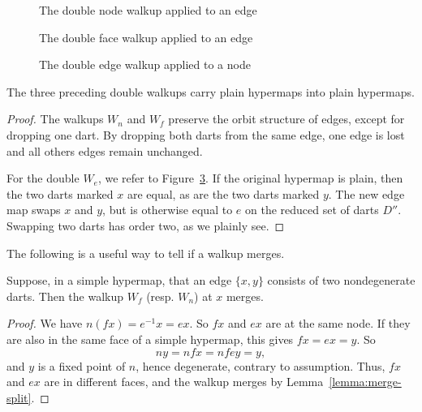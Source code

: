 \begin{figure}[htb]
  \centering
  \caption{The double node walkup applied to an edge}
  \label{fig:doublenode}
\end{figure}


\begin{figure}[htb]
  \centering
  \caption{The double face walkup applied to an edge}
  \label{fig:doubleface}
\end{figure}


\begin{figure}[htb]
  \centering
  \caption{The double edge walkup applied to a node}
  \label{fig:doubleedge}
\end{figure}


\begin{lemma}  The three preceding double walkups carry plain
hypermaps into plain hypermaps.
\end{lemma}

\begin{proof} The walkups $W_n$ and $W_f$ preserve the orbit
structure of edges, except for dropping one dart.  By dropping both
darts from the same edge, one edge is lost and all others edges
remain unchanged.

For the double $W_e$, we refer to Figure~\ref{fig:doubleedge}.  
If the
original hypermap is plain, then the two darts marked 
$x$ are equal, as are
the two darts marked $y$.  
The new edge map swaps $x$ and $y$, but is 
otherwise equal to $e$ on 
the reduced set of darts $D''$.  
Swapping two darts has order two, 
as we plainly see.
\end{proof}

The following is a useful way to tell if a walkup merges.


\begin{lemma}  Suppose, in a simple hypermap, 
that an edge $\{x,y\}$ consists of two nondegenerate darts.  
Then the walkup
 $W_f$ (resp. $W_n$) at $x$  merges.
\end{lemma}

\begin{proof} 
We have $n (f x) = e^{-1} x = e x$. So $f x$ and $e x$ are at the
same node. If they are also in the same face of a simple hypermap, 
this gives $f x = e x
= y$. So $$n y  = n f x = n f e y = y,$$ and $y$ is a fixed
point of $n$, hence degenerate, contrary to assumption.  
Thus, $f x$
and $e x$ are in different faces, and the walkup merges
by Lemma~\ref{lemma:merge-split}.  
\end{proof}




